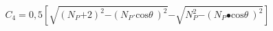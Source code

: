 \begin{equation}
C_{\mathrm{4}}\mathrm{=0,5}\left[\sqrt{{\left(N_P\mathrm{+2}\right)}^{\mathrm{2}}\mathrm{-}{\left(N_P\mathrm{\cdot }{\mathrm{cos} \theta \ }\right)}^{\mathrm{2}}}\mathrm{-}\sqrt{N^{\mathrm{2}}_P\mathrm{-}{\left(N_P\mathrm{\bullet }{\mathrm{cos} \theta \ }\right)}^{\mathrm{2}}}\right]
\end{equation}